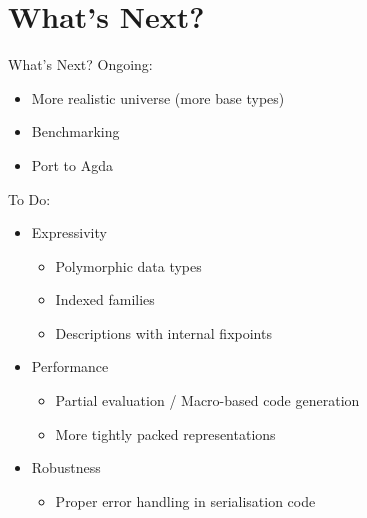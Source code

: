 
\section{What's Next?}

\begin{frame}{What's Next?}
Ongoing:
\begin{itemize}
  \item More realistic universe (more base types)
  \item Benchmarking
  \item Port to Agda
\end{itemize}
\bigskip
To Do:
\begin{itemize}
  \item Expressivity
  \begin{itemize}
    \item Polymorphic data types
    \item Indexed families
    \item Descriptions with internal fixpoints
  \end{itemize}

  \item Performance
  \begin{itemize}
    \item Partial evaluation / Macro-based code generation
    \item More tightly packed representations
  \end{itemize}

  \item Robustness
  \begin{itemize}
    \item Proper error handling in serialisation code
  \end{itemize}
\end{itemize}
\end{frame}
